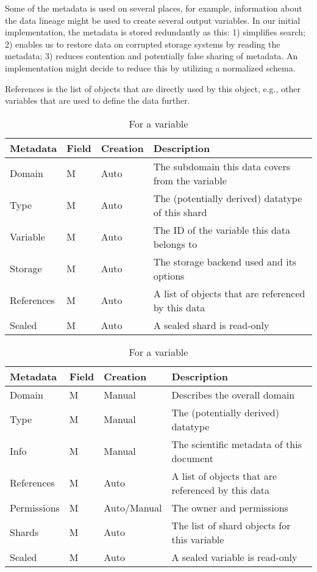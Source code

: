 Some of the metadata is used on several places, for example, information about the data lineage might be used to create several output variables.
In our initial implementation, the metadata is stored redundantly as this:
1) simplifies search; 2) enables us to restore data on corrupted storage systems by reading the metadata; 3) reduces contention and potentially false sharing of metadata.
An implementation might decide to reduce this by utilizing a normalized schema.

References is the list of objects that are directly used by this object, e.g., other variables that are used to define the data further.

\begin{table}
\begin{subtable}[t]{\textwidth}
\begin{tabular}{llll}
Metadata & Field & Creation & Description\\
\hline
Domain   & M & Auto & The subdomain this data covers from the variable\\
Type     & M & Auto & The (potentially derived) datatype of this shard\\
Variable & M & Auto & The ID of the variable this data belongs to\\
Storage  & M & Auto & The storage backend used and its options\\
References & M & Auto & A list of objects that are referenced by this data\\
Sealed   & M & Auto & A sealed shard is read-only\\
\end{tabular}
\caption{For a shard}
\end{subtable}

\begin{subtable}[t]{\textwidth}
\begin{tabular}{llll}
Metadata & Field & Creation & Description\\
\hline
Domain      & M & Manual & Describes the overall domain\\
Type   	    & M & Manual & The (potentially derived) datatype\\
Info   	    & M & Manual & The scientific metadata of this document\\
References  & M & Auto & A list of objects that are referenced by this data\\
Permissions & M & Auto/Manual & The owner and permissions \\
Shards      & M & Auto & The list of shard objects for this variable\\
Sealed      & M & Auto & A sealed variable is read-only\\
\end{tabular}
\caption{For a variable}
\end{subtable}


\end{table}
